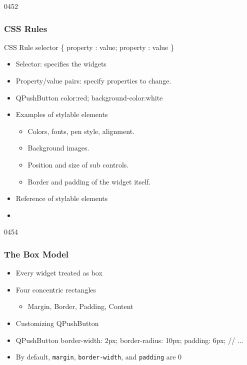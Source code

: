 \begin{slide}[fragile]{0452}\frametitle{CSS Rules}
\begin{block}{CSS Rule}
selector \{ property : value; property : value \}    
  \end{block}
\begin{itemize}
\item Selector: specifies the  widgets
\item Property/value pairs: specify properties to change.
\item[] \begin{cpp}
QPushButton {color:red; background-color:white}    
  \end{cpp}
\item Examples of stylable elements
  \begin{itemize}
  \item Colors, fonts, pen style, alignment.
  \item Background images.
  \item Position and size of sub controls.
  \item Border and padding of the widget itself.
  \end{itemize}
\item Reference of stylable elements
\item[] 
\end{itemize}
\end{slide}

\begin{slide}[fragile]{0454}\frametitle{The Box Model}
\begin{itemize}
\item Every widget treated as box
\item Four concentric rectangles
  \begin{itemize}
  \item Margin, Border, Padding, Content
  \end{itemize}
\item Customizing QPushButton
  \item[] \begin{cpp}
QPushButton {
  border-width: 2px;
  border-radius: 10px;
  padding: 6px;
  // ...
 }    
  \end{cpp}
\item By default, \texttt{margin}, \texttt{border-width}, and \texttt{padding} are 0
\end{itemize}
\end{slide}


